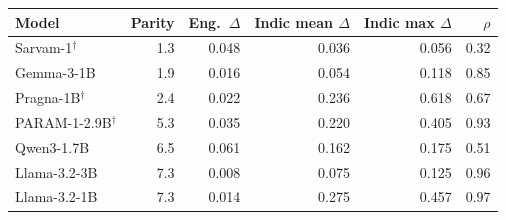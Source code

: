 \begin{tabular}{lrrrrr}
\toprule
Model & Parity & Eng.\ $\Delta$ & Indic mean $\Delta$ & Indic max $\Delta$ & $\rho$ \\
\midrule
Sarvam-1$^\dagger$ & 1.3 & 0.048 & 0.036 & 0.056 & 0.32 \\
Gemma-3-1B & 1.9 & 0.016 & 0.054 & 0.118 & 0.85 \\
Pragna-1B$^\dagger$ & 2.4 & 0.022 & 0.236 & 0.618 & 0.67 \\
PARAM-1-2.9B$^\dagger$ & 5.3 & 0.035 & 0.220 & 0.405 & 0.93 \\
Qwen3-1.7B & 6.5 & 0.061 & 0.162 & 0.175 & 0.51 \\
Llama-3.2-3B & 7.3 & 0.008 & 0.075 & 0.125 & 0.96 \\
Llama-3.2-1B & 7.3 & 0.014 & 0.275 & 0.457 & 0.97 \\
\bottomrule
\end{tabular}